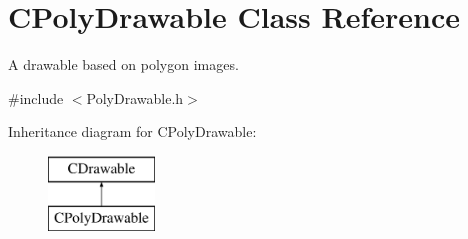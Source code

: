 \hypertarget{class_c_poly_drawable}{\section{C\+Poly\+Drawable Class Reference}
\label{class_c_poly_drawable}
}


A drawable based on polygon images.  




{\ttfamily \#include $<$Poly\+Drawable.\+h$>$}

Inheritance diagram for C\+Poly\+Drawable\+:\begin{figure}[H]
\begin{center}
\leavevmode
\includegraphics[height=2.000000cm]{class_c_poly_drawable}
\end{center}
\end{figure}

